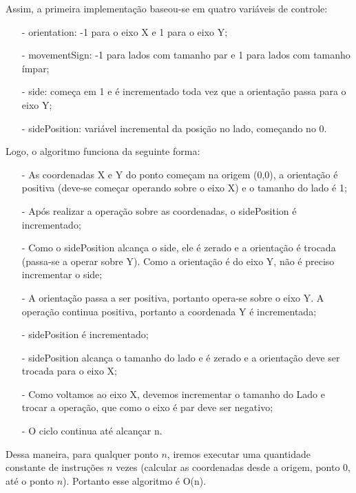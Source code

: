\documentclass[12pt,a4paper]{article}
\begin{document}
       Assim, a primeira implementação baseou-se em quatro variáveis de controle:
        \begin{itemize}
        	\item[-] orientation: -1 para o eixo X e 1 para o eixo Y;
        	\item[-] movementSign: -1 para lados com tamanho par e 1 para lados com tamanho ímpar;
        	\item[-] side: começa em 1 e é incrementado toda vez que a orientação passa para o eixo Y;
        	\item[-] sidePosition: variável incremental da posição no lado, começando no 0.
    	\end{itemize}
    	
        Logo, o algoritmo funciona da seguinte forma:
        \begin{itemize}
    	    \item[-] As coordenadas X e Y do ponto começam na origem (0,0), a orientação é positiva (deve-se começar operando sobre o eixo X) e o tamanho do lado é 1;
        	\item[-] Após realizar a operação sobre as coordenadas, o sidePosition é incrementado;
        	\item[-] Como o sidePosition alcança o side, ele é zerado e a orientação é trocada (passa-se a operar sobre Y). Como a orientação é do eixo Y, não é preciso incrementar o side;
        	\item[-] A orientação passa a ser positiva, portanto opera-se sobre o eixo Y. A operação continua positiva, portanto a coordenada Y é incrementada;
        	\item[-] sidePosition é incrementado;
        	\item[-] sidePosition alcança o tamanho do lado e é zerado e a orientação deve ser trocada para o eixo X;
        	\item[-] Como voltamos ao eixo X, devemos incrementar o tamanho do Lado e trocar a operação, que como o eixo é par deve ser negativo;
        	\item[-] O ciclo continua até alcançar n.
    	\end{itemize}
        Dessa maneira, para qualquer ponto $n$, iremos executar uma quantidade constante de instruções $n$ vezes (calcular as coordenadas desde a origem, ponto 0, até o ponto $n$). Portanto esse algoritmo é O(n).
    
    
\end{document}
